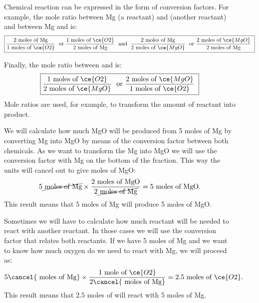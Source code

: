 \documentclass[main.tex]{subfiles}
\begin{document}
\begin{description}
\item[] 
Chemical reaction can be expressed in the form of conversion factors. 
For example, the mole ratio between Mg (a reactant) and  (another reactant) and between Mg and  is:
\begin{equation*}
\boxed{   \frac{\text{2 moles of Mg}}{\text{1 moles of } \ce{O2}}\ \text{ or  } \frac{ \text{1 moles of } \ce{O2}}{ \text{2 moles of Mg}}\ \text{ and }\: \frac{\text{2 moles of Mg}}{\text{2 moles of } \ce{MgO}}\ \text{ or  } \frac{ \text{2 moles of } \ce{MgO}}{ \text{2 moles of Mg}}\   }
\end{equation*}

Finally, the mole ratio between  and  is:
\begin{equation*}
\boxed{   \frac{\text{1 moles of }\ce{O2}}{\text{2 moles of } \ce{MgO}}\ \text{ or  } \frac{ \text{2 moles of } \ce{MgO}}{ \text{1 moles of }\ce{O2}}\   }
\end{equation*}
Mole ratios are used, for example, to transform the amount of reactant into product.
\item[] 
We will calculate how much MgO will be produced from 5 moles of Mg by converting Mg into MgO by means of the conversion factor between both chemicals. As we want to transform the Mg into MgO we will use the conversion factor with Mg on the bottom of the fraction. This way the units will cancel out to give moles of MgO:
 \begin{equation*}
5\cancel{\text{ moles of Mg}} \times \dfrac{\text{2 moles of MgO}}{2\cancel{\text{ moles of Mg}}}=5\text{ moles of MgO}.
\end{equation*}
This result means that 5 moles of Mg will produce 5 moles of MgO.

\item[] 
Sometimes we will have to calculate how much reactant will be needed to react with another reactant. In those cases we will use the conversion factor that relates both reactants. If we have 5 moles of Mg and we want to know how much oxygen do we need to react with Mg, we will proceed as:
\begin{equation*}
5\cancel{\text{ moles of Mg}} \times \dfrac{\text{1 mole of }\ce{O2}}{2\cancel{\text{ moles of Mg}}}=2.5\text{ moles of }\ce{O2}.
\end{equation*}
This result means that 2.5 moles of  will react with 5 moles of Mg.


\end{description}
\end{document}
